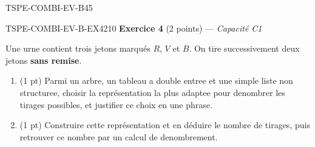 \begin{evaluation}{TSPE-COMBI-EV-B}{45}
\begin{exercice}{TSPE-COMBI-EV-B-EX4}{2}{10}
\textbf{Exercice 4} (2 points) — \textit{Capacité C1}

\medskip

Une urne contient trois jetons marqués $R$, $V$ et $B$. On tire successivement deux jetons \textbf{sans remise}.
\begin{enumerate}
  \item (1 pt) Parmi un arbre, un tableau a double entree et une simple liste non structuree, choisir la représentation la plus adaptee pour denombrer les tirages possibles, et justifier ce choix en une phrase.
  \item (1 pt) Construire cette représentation et en déduire le nombre de tirages, puis retrouver ce nombre par un calcul de denombrement.
\end{enumerate}
\end{exercice}

\end{evaluation}
